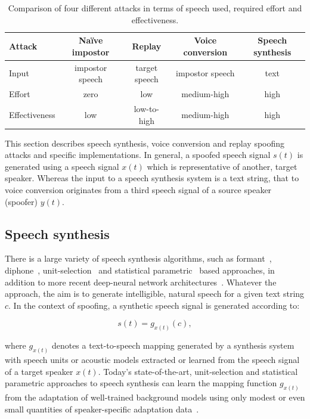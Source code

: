 \begin{table}[!ht]
\renewcommand{\arraystretch}{1.3}
\begin{center}
    \begin{tabular}{ l | c c c c }
    \hline
     	 Attack & Na\"{i}ve impostor &  Replay & Voice conversion & Speech synthesis\\ 
    \hline
Input         & impostor speech  & target speech & impostor speech & text\\
Effort        & zero & low & medium-high & high\\
Effectiveness & low &  low-to-high & medium-high & high\\
 \hline
\hline
    \end{tabular}
    \caption{Comparison of four different attacks in terms of speech used,  required effort and effectiveness.}
		\label{tab::attacks}
   \end{center}
\end{table}

This section describes speech synthesis, voice conversion and replay spoofing attacks and specific implementations.  In general, a spoofed speech signal $s(t)$ is generated using a speech signal $x(t)$ which is representative of another, target speaker.  Whereas the input to a speech synthesis system is a text string, that to voice conversion originates from a third speech signal of a source speaker (spoofer) $y(t)$.  



\subsection{Speech synthesis}
\label{ssec:spsyn}

There is a large variety of speech synthesis algorithms, such as formant~\cite{Klatt1980}, diphone~\cite{Moulines1990}, unit-selection~\cite{Hunt1996} and statistical parametric~\cite{Tokuda2000} based approaches, in addition to more recent deep-neural network architectures~\cite{Zen2013}.  Whatever the approach, the aim is to generate intelligible, natural speech for a given text string $c$. In the context of spoofing, a synthetic speech signal is generated according to:

\begin{equation}
s(t) = g_{x(t)}(c),
\label{eq:tts}
\end{equation}

\noindent where $g_{x(t)}$ denotes a text-to-speech mapping generated by a synthesis system with speech units or acoustic models extracted or learned from the speech signal of a target speaker $x(t)$.  Today's state-of-the-art, unit-selection and statistical parametric approaches to speech synthesis can learn the mapping function $g_{x(t)}$ from the adaptation of well-trained background models using only modest or even small quantities of speaker-specific adaptation data~\cite{Zen2007a}.  


